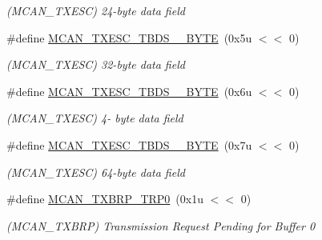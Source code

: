 \begin{DoxyCompactItemize}
\begin{DoxyCompactList}\small\item\em (M\+C\+A\+N\+\_\+\+T\+X\+E\+SC) 24-\/byte data field \end{DoxyCompactList}\item 
\mbox{\label{group__SAME70__MCAN_gaf72077eb72d27e669fb1d32f13142f3e}} 
\#define \mbox{\hyperlink{group__SAME70__MCAN_gaf72077eb72d27e669fb1d32f13142f3e}{M\+C\+A\+N\+\_\+\+T\+X\+E\+S\+C\+\_\+\+T\+B\+D\+S\+\_\+\_\+\+B\+Y\+TE}}~(0x5u $<$$<$ 0)
\begin{DoxyCompactList}\small\item\em (M\+C\+A\+N\+\_\+\+T\+X\+E\+SC) 32-\/byte data field \end{DoxyCompactList}\item 
\mbox{\label{group__SAME70__MCAN_gaca474e7d82d46ae8315ea0af1a847c36}} 
\#define \mbox{\hyperlink{group__SAME70__MCAN_gaca474e7d82d46ae8315ea0af1a847c36}{M\+C\+A\+N\+\_\+\+T\+X\+E\+S\+C\+\_\+\+T\+B\+D\+S\+\_\+\_\+\+B\+Y\+TE}}~(0x6u $<$$<$ 0)
\begin{DoxyCompactList}\small\item\em (M\+C\+A\+N\+\_\+\+T\+X\+E\+SC) 4-\/ byte data field \end{DoxyCompactList}\item 
\mbox{\label{group__SAME70__MCAN_ga57650a3f6f9f289da5585b5a84c5823d}} 
\#define \mbox{\hyperlink{group__SAME70__MCAN_ga57650a3f6f9f289da5585b5a84c5823d}{M\+C\+A\+N\+\_\+\+T\+X\+E\+S\+C\+\_\+\+T\+B\+D\+S\+\_\+\_\+\+B\+Y\+TE}}~(0x7u $<$$<$ 0)
\begin{DoxyCompactList}\small\item\em (M\+C\+A\+N\+\_\+\+T\+X\+E\+SC) 64-\/byte data field \end{DoxyCompactList}\item 
\mbox{\label{group__SAME70__MCAN_gadc642b8a347be0717fa10e28bb033d21}} 
\#define \mbox{\hyperlink{group__SAME70__MCAN_gadc642b8a347be0717fa10e28bb033d21}{M\+C\+A\+N\+\_\+\+T\+X\+B\+R\+P\+\_\+\+T\+R\+P0}}~(0x1u $<$$<$ 0)
\begin{DoxyCompactList}\small\item\em (M\+C\+A\+N\+\_\+\+T\+X\+B\+RP) Transmission Request Pending for Buffer 0 \end{DoxyCompactList}\item 

\end{DoxyCompactItemize}
